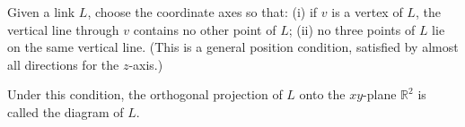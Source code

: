 Given a link $L$, choose the coordinate axes so that: (i) if $v$ is a vertex of $L$, the vertical line through $v$ contains no other point of $L$; (ii) no three points of $L$ lie on the same vertical line. (This is a general position condition, satisfied by almost all directions for the $z$-axis.)

Under this condition, the orthogonal projection of $L$ onto the $xy$-plane $\mathbb{R}^2$ is called the diagram of $L$.
